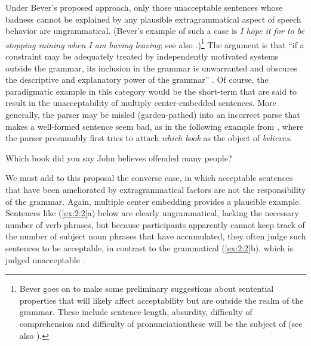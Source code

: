 Under Bever's proposed approach, only those unacceptable sentences whose badness cannot be explained by any plausible extragrammatical aspect of speech behavior are ungrammatical. (Bever's example of such a case is \textit{I hope it for to be stopping raining when I am having leaving}; see also \citealt{Bever1971}.)\footnote{Bever goes on to make some preliminary suggestions about sentential properties that will likely affect acceptability but are outside the realm of the grammar. These include sentence length, absurdity, difficulty of comprehension and difficulty of pronunciation\schdash{}these will be the subject of  (see also \citealt{KatzEtAl1976}).}
 The argument is that ``if a constraint may be adequately treated by independently motivated systems outside the grammar, its inclusion in the grammar is unwarranted and obscures the descriptive and explanatory power of the grammar'' \citep[150]{BeverEtAl1976a}. Of course, the paradigmatic example in this category would be the short-term  that are said to result in the unacceptability of multiply center-embedded sentences. More generally, the parser may be misled (garden-pathed) into an incorrect parse that makes a well-formed sentence seem bad, as in the following example from \citet{Ellis1991}, where the
parser presumably first tries to attach \textit{which book} as the object of \textit{believes}.

\ea \label{ex:2:1}
    Which book did you say John believes offended many people?
\z

	   

We must add to this proposal the converse case, in which acceptable sentences that have been ameliorated by extragrammatical factors are not the responsibility of the grammar. Again, multiple center embedding provides a plausible example. Sentences like (\ref{ex:2:2}a) below are clearly ungrammatical, lacking the necessary number of verb phrases, but because participants apparently cannot keep track of the number of subject noun phrases that have accumulated, they often judge such sentences to be acceptable, in contrast to the grammatical (\ref{ex:2:2}b), which is judged unacceptable \citep{Frazier1985}.

